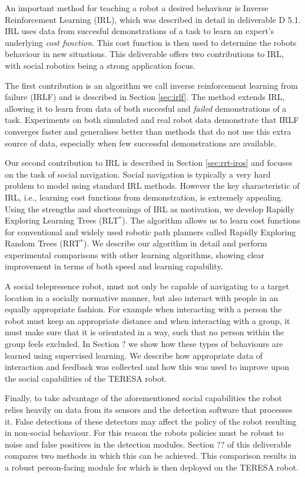 \documentclass[a4paper,11pt]{report}
\begin{document}
An important method for teaching a robot a desired behaviour is Inverse Reinforcement Learning (IRL), which was described in detail in deliverable D 5.1. IRL uses data from succesful demonstrations of a task to learn an expert's underlying \emph{cost function}. This cost function is then used to determine the robots behaviour in new situations. This deliverable offers two contributions to IRL, with social robotics being a strong application focus.

The first contribution is an algorithm we call inverse reinforcement learning from failure (IRLF) and is described in Section \ref{sec:irlf}. The method extends IRL, allowing it to learn from data of both succesful and \emph{failed} demonstrations of a task. Experiments on both simulated and real robot data demonstrate that IRLF converges faster and generalises better than methods that do not use this extra source of data, especially when few successful demonstrations are available. 

Our second contribution to IRL is described in Section \ref{sec:rrt-iros} and focuses on the task of social navigation. Social navigation is typically a very hard problem to model using standard IRL methods. However the key characteristic of IRL, i.e., learning cost functions from demonstration, is extremely appealing. Using the strengths and shortcomings of IRL as motivation, we develop Rapidly Exploring Learning Trees (RLT$^*$). The algorithm allows us to learn cost functions for conventional and widely used robotic path planners called Rapidly Exploring Random Trees (RRT$^*$). We describe our algorithm in detail and perform experimental comparisons with other learning algorithms, showing clear improvement in terms of both speed and learning capability.

A social telepresence robot, must not only be capable of navigating to a target location in a socially normative manner, but also interact with people in an equally appropriate fashion. For example when interacting with a person the robot must keep an appropriate distance and when interacting with a group, it must make sure that it is orientated in a way, such that no person within the group feels excluded. In Section ? we show how these types of behaviours are learned using supervised learning. We describe how appropriate data of interaction and feedback was collected and how this was used to improve upon the social capabilities of the TERESA robot.

Finally, to take advantage of the aforementioned social capabilities the robot relies heavily on data from its sensors and the detection software that processes it. False detections of these detectors may affect the policy of the robot resulting in non-social behaviour. For this reason the robots policies must be robust to noise and false positives in the detection modules. Section ?? of this deliverable compares two methods in which this can be achieved. This comparison results in a robust person-facing module for which is then deployed on the TERESA robot.
\end{document}
